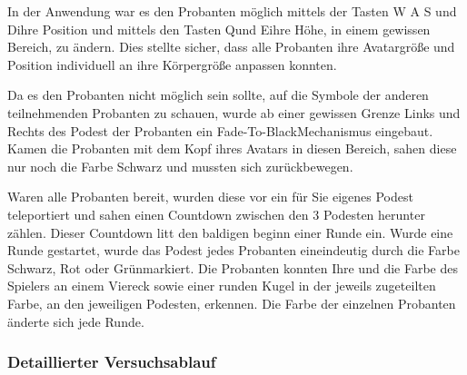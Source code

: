 \documentclass[a4paper,11pt]{article}%
\renewcommand{\\}{\vspace*{0.5\baselineskip} \newline}
\begin{document}
In der Anwendung war es den Probanten möglich mittels der Tasten \flqq W A S und D\frqq ihre Position und mittels den Tasten \flqq Q\frqq und \flqq E\frqq ihre Höhe, in einem gewissen Bereich, zu ändern. Dies stellte sicher, dass alle Probanten ihre Avatargröße und Position individuell an ihre Körpergröße anpassen konnten.

Da es den Probanten nicht möglich sein sollte, auf die Symbole der anderen teilnehmenden Probanten zu schauen, wurde ab einer gewissen Grenze Links und Rechts des Podest der Probanten ein \flqq Fade-To-Black\frqq Mechanismus eingebaut. Kamen die Probanten mit dem Kopf ihres Avatars in diesen Bereich, sahen diese nur noch die Farbe Schwarz und mussten sich zurückbewegen.

Waren alle Probanten bereit, wurden diese vor ein für Sie eigenes Podest teleportiert und sahen einen Countdown zwischen den 3 Podesten herunter zählen. Dieser Countdown litt den baldigen beginn einer Runde ein.
Wurde eine Runde gestartet, wurde das Podest jedes Probanten eineindeutig durch die Farbe \flqq Schwarz, Rot oder Grün\frqq markiert. Die Probanten konnten Ihre und die Farbe des Spielers an einem Viereck sowie einer runden Kugel in der jeweils zugeteilten Farbe, an den jeweiligen Podesten, erkennen. Die Farbe der einzelnen Probanten änderte sich jede Runde.

	\subsubsection{Detaillierter Versuchsablauf}
\end{document}
